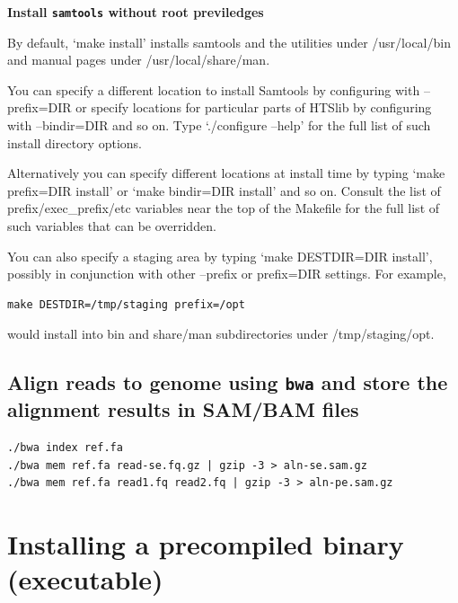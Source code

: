 \documentclass[]{book}
\let\BeginKnitrBlock\begin \let\EndKnitrBlock\end
\begin{document}
\BeginKnitrBlock{rmdtip}
\textbf{Install \texttt{samtools} without root previledges}

By default, `make install' installs samtools and the utilities under
/usr/local/bin and manual pages under /usr/local/share/man.

You can specify a different location to install Samtools by configuring
with --prefix=DIR or specify locations for particular parts of HTSlib by
configuring with --bindir=DIR and so on. Type `./configure --help' for
the full list of such install directory options.

Alternatively you can specify different locations at install time by
typing `make prefix=DIR install' or `make bindir=DIR install' and so on.
Consult the list of prefix/exec\_prefix/etc variables near the top of the
Makefile for the full list of such variables that can be overridden.

You can also specify a staging area by typing `make DESTDIR=DIR install',
possibly in conjunction with other --prefix or prefix=DIR settings.
For example,

\begin{verbatim}
make DESTDIR=/tmp/staging prefix=/opt
\end{verbatim}

would install into bin and share/man subdirectories under /tmp/staging/opt.
\EndKnitrBlock{rmdtip}

\hypertarget{align-reads-to-genome-using-bwa-and-store-the-alignment-results-in-sambam-files}{%
\subsection{\texorpdfstring{Align reads to genome using \texttt{bwa} and store the alignment results in SAM/BAM files}{Align reads to genome using bwa and store the alignment results in SAM/BAM files}}\label{align-reads-to-genome-using-bwa-and-store-the-alignment-results-in-sambam-files}}

\begin{verbatim}
./bwa index ref.fa
./bwa mem ref.fa read-se.fq.gz | gzip -3 > aln-se.sam.gz
./bwa mem ref.fa read1.fq read2.fq | gzip -3 > aln-pe.sam.gz
\end{verbatim}

\hypertarget{installing-a-precompiled-binary-executable}{%
\section{Installing a precompiled binary (executable)}\label{installing-a-precompiled-binary-executable}}
\end{document}
